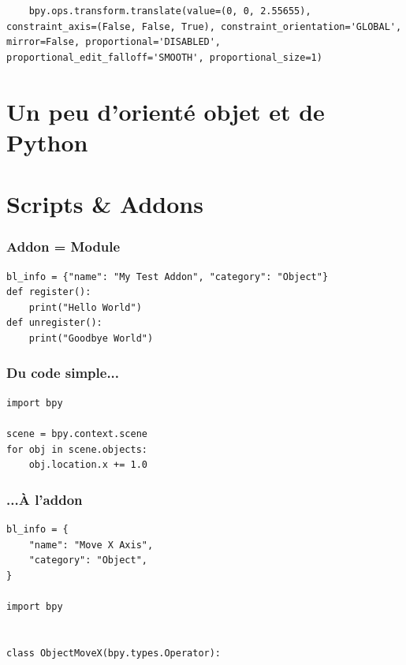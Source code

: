 \documentclass[11pt,usenames,dvipsnames]{beamer}
\begin{document}
\begin{frame}[fragile]
  \begin{lstlisting}
    bpy.ops.transform.translate(value=(0, 0, 2.55655), constraint_axis=(False, False, True), constraint_orientation='GLOBAL', mirror=False, proportional='DISABLED', proportional_edit_falloff='SMOOTH', proportional_size=1)
  \end{lstlisting}
\end{frame}



\section{Un peu d'orienté objet et de Python}

\section{Scripts \& Addons}
\begin{frame}[fragile]
  \frametitle{Addon = Module}
  \begin{lstlisting}
bl_info = {"name": "My Test Addon", "category": "Object"}
def register():
    print("Hello World")
def unregister():
    print("Goodbye World")
  \end{lstlisting}
\end{frame}

\begin{frame}[fragile]
  \frametitle{Du code simple...}
  \begin{lstlisting}
import bpy

scene = bpy.context.scene
for obj in scene.objects:
    obj.location.x += 1.0
  \end{lstlisting}
\end{frame}

\begin{frame}[fragile]
  \frametitle{...À l'addon}
  \begin{lstlisting}
bl_info = {
    "name": "Move X Axis",
    "category": "Object",
}

import bpy


class ObjectMoveX(bpy.types.Operator):
  \end{lstlisting}
\end{frame}
\end{document}

